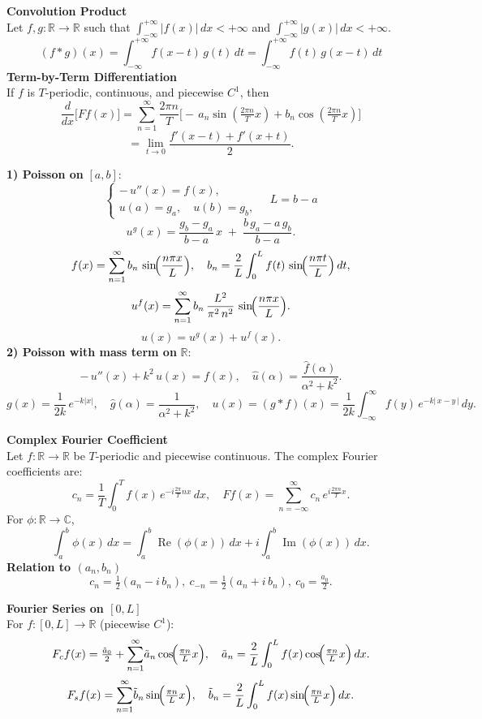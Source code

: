 \documentclass[8pt]{article}
\begin{document}
\begin{multicols}{2}
\small
\noindent \textbf{Convolution Product}\\
Let \(f,g:\mathbb{R} \to \mathbb{R}\) such that
\(\int_{-\infty}^{+\infty} |f(x)|\,dx < +\infty\) and
\(\int_{-\infty}^{+\infty} |g(x)|\,dx < +\infty\).
\[
  (f * g)(x)
  = \int_{-\infty}^{+\infty} f(x - t)\,g(t)\,dt
  = \int_{-\infty}^{+\infty} f(t)\,g(x - t)\,dt
\]
\noindent \textbf{Term-by-Term Differentiation}\\
If $f$ is $T$-periodic, continuous, and piecewise $C^1$, then
\[
  \frac{d}{dx}\bigl[Ff(x)\bigr]
  = \sum_{n=1}^\infty \frac{2\pi n}{T}\bigl[-\,a_n\sin(\tfrac{2\pi n}{T}x)
    +b_n\cos(\tfrac{2\pi n}{T}x)\bigr]
\]
\[
  = \lim_{t \to 0} \frac{f'(x - t) + f'(x + t)}{2}.
\]

\noindent \textbf{1) Poisson on }$[a,b]$:
\[
\begin{cases}
-\,u''(x)=f(x),\\[2pt]
u(a)=g_a,\quad u(b)=g_b,
\end{cases}
\quad
L = b - a
\]
\[
u^g(x)=\frac{g_b-g_a}{b-a}\,x \;+\;\frac{b\,g_a - a\,g_b}{b-a}.
\]
\[
f(x)=\sum_{n=1}^{\infty} b_n \,\sin\!\Bigl(\frac{n\pi x}{L}\Bigr),
\quad
b_n=\frac{2}{L}\int_{0}^{L}f(t)\,\sin\!\Bigl(\frac{n\pi t}{L}\Bigr)\,dt,
\]
\[
u^f(x)=\sum_{n=1}^{\infty} b_n \,\frac{L^2}{\pi^2\,n^2}
\,\sin\!\Bigl(\frac{n\pi x}{L}\Bigr).
\]
\[
u(x)=u^g(x)+u^f(x).
\]
\noindent \textbf{2) Poisson with mass term on }$\mathbb{R}$:
\[
-\,u''(x)+k^2\,u(x)=f(x),
\quad
\widehat{u}(\alpha)=\frac{\widehat{f}(\alpha)}{\alpha^2 + k^2}.
\]
\[
g(x)=\frac{1}{2k}\,e^{-k|x|},
\quad
\widehat{g}(\alpha)=\frac{1}{\alpha^2 + k^2},
\quad
u(x)=(g*f)(x)
=\frac{1}{2k}\!\int_{-\infty}^{\infty} f(y)\,e^{-k|\,x-y\,|}\,dy.
\]

\columnbreak

\noindent \textbf{Complex Fourier Coefficient}\\
Let \( f : \mathbb{R} \to \mathbb{R} \) be \( T \)-periodic and piecewise continuous.  The complex Fourier coefficients are:
\[
  c_n = \frac{1}{T} \int_0^T f(x)\, e^{-i \frac{2\pi}{T} n x} \, dx,
  \quad
  Ff(x) = \sum_{n=-\infty}^{\infty} c_{n}\,e^{i\frac{2\pi n}{T}x}.
\]
For \( \phi : \mathbb{R} \to \mathbb{C} \),
\[
  \int_a^b \phi(x)\,dx
  = \int_a^b \operatorname{Re}(\phi(x)) \, dx + i \int_a^b \operatorname{Im}(\phi(x)) \, dx.
\]
\noindent \textbf{Relation to \( (a_n, b_n) \)}\quad
\[
  c_{n} = \tfrac{1}{2}(a_{n} - i\,b_{n}),\
  c_{-n} = \tfrac{1}{2}(a_{n} + i\,b_{n}),\
  c_{0} = \tfrac{a_{0}}{2}.
\]

\noindent \textbf{Fourier Series on $[0,L]$}\\
For $f:[0,L]\to \mathbb{R}$ (piecewise $C^1$):
\[
  F_{c}f(x)=\tfrac{\tilde a_{0}}{2} + \sum_{n=1}^{\infty}\!\tilde a_{n}\cos\!\Bigl(\tfrac{\pi n}{L}x\Bigr),
  \quad \tilde a_{n}=\frac{2}{L}\int_{0}^{L} f(x)\cos\!\Bigl(\tfrac{\pi n}{L}x\Bigr)\,dx.
\]
\[
  F_{s}f(x)=\sum_{n=1}^{\infty}\!\tilde b_{n}\sin\!\Bigl(\tfrac{\pi n}{L}x\Bigr),
  \quad \tilde b_{n}=\frac{2}{L}\int_{0}^{L} f(x)\sin\!\Bigl(\tfrac{\pi n}{L}x\Bigr)\,dx.
\]


\end{multicols}
\end{document}
